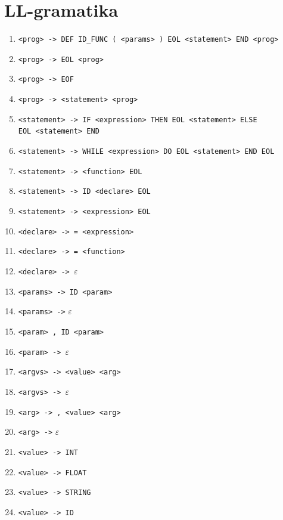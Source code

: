 \documentclass [11pt, a4paper]{article}
\begin{document}
\section{LL-gramatika}
\begin{table}[H]
	\centering
    \begin{enumerate}[noitemsep]
        \item \verb|<prog> -> DEF ID_FUNC ( <params> ) EOL <statement> END <prog>|
        \item \verb|<prog> -> EOL <prog>|
        \item \verb|<prog> -> EOF|
        \item \verb|<prog> -> <statement> <prog>|
        
        \item \verb|<statement> -> IF <expression> THEN EOL <statement> ELSE| \\ 
\verb|EOL <statement> END|
        \item \verb|<statement> -> WHILE <expression> DO EOL <statement> END EOL|
        \item \verb|<statement> -> <function> EOL|
        \item \verb|<statement> -> ID <declare> EOL|
	\item \verb|<statement> -> <expression> EOL|
        
        \item \verb|<declare> -> = <expression>|
        \item \verb|<declare> -> = <function>|
        \item \verb|<declare> -> |$\varepsilon$
        
        \item \verb|<params> -> ID <param>|
        \item \verb|<params> ->| $\varepsilon$
        
        \item \verb|<param> , ID <param>|
        \item \verb|<param> -> |$\varepsilon$
    
        \item \verb|<argvs> -> <value> <arg>|
        \item \verb|<argvs> -> |$\varepsilon$
        
        \item \verb|<arg> -> , <value> <arg>|
        \item \verb|<arg> ->| $\varepsilon$
        
        \item \verb|<value> -> INT|
        \item \verb|<value> -> FLOAT|
        \item \verb|<value> -> STRING|
        \item \verb|<value> -> ID|
       

\end{enumerate}
\end{table}
\end{document}
